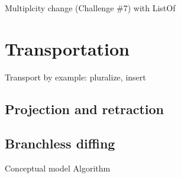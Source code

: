 \documentclass[english,submission]{programming}
\theoremstyle{definition}
\newcommand{\mathbox}[1]{\colorbox{black!10}{$#1$}}
\begin{document}
Multiplcity change (Challenge \#7) with ListOf








\section{Transportation}
Transport by example: pluralize, insert

\subsection{Projection and retraction}

\subsection{Branchless diffing}
Conceptual model
Algorithm
\end{document}
